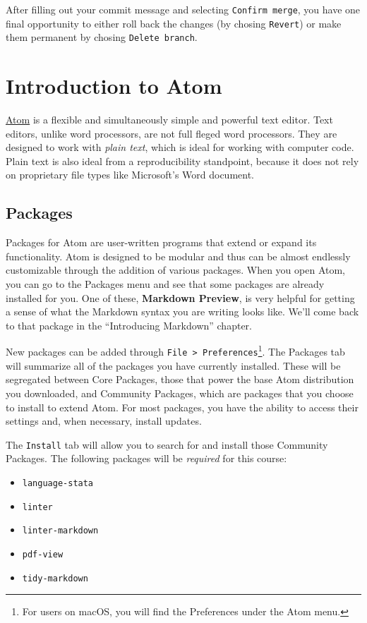 \documentclass[]{book}
\providecommand{\tightlist}{%
  \setlength{\itemsep}{0pt}\setlength{\parskip}{0pt}}
\let\rmarkdownfootnote\footnote%
\def\footnote{\protect\rmarkdownfootnote}
\theoremstyle{definition}
\theoremstyle{definition}
\theoremstyle{definition}
\theoremstyle{remark}
\begin{document}
After filling out your commit message and selecting
\texttt{Confirm\ merge}, you have one final opportunity to either roll
back the changes (by chosing \texttt{Revert}) or make them permanent by
chosing \texttt{Delete\ branch}.

\chapter{Introduction to Atom}\label{introduction-to-atom}

\href{https://atom.io}{Atom} is a flexible and simultaneously simple and
powerful text editor. Text editors, unlike word processors, are not full
fleged word processors. They are designed to work with \emph{plain
text}, which is ideal for working with computer code. Plain text is also
ideal from a reproducibility standpoint, because it does not rely on
proprietary file types like Microsoft's Word document.

\section{Packages}\label{packages}

Packages for Atom are user-written programs that extend or expand its
functionality. Atom is designed to be modular and thus can be almost
endlessly customizable through the addition of various packages. When
you open Atom, you can go to the Packages menu and see that some
packages are already installed for you. One of these, \textbf{Markdown
Preview}, is very helpful for getting a sense of what the Markdown
syntax you are writing looks like. We'll come back to that package in
the ``Introducing Markdown'' chapter.

New packages can be added through
\texttt{File\ \textgreater{}\ Preferences}\footnote{For users on macOS,
  you will find the Preferences under the Atom menu.}. The Packages tab
will summarize all of the packages you have currently installed. These
will be segregated between Core Packages, those that power the base Atom
distribution you downloaded, and Community Packages, which are packages
that you choose to install to extend Atom. For most packages, you have
the ability to access their settings and, when necessary, install
updates.

The \texttt{Install} tab will allow you to search for and install those
Community Packages. The following packages will be \emph{required} for
this course:

\begin{itemize}
\tightlist
\item
  \texttt{language-stata}
\item
  \texttt{linter}
\item
  \texttt{linter-markdown}
\item
  \texttt{pdf-view}
\item
  \texttt{tidy-markdown}
\end{itemize}
\end{document}

